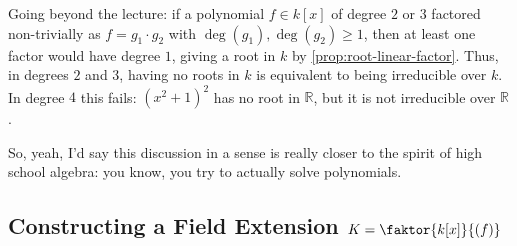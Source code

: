 \begin{content}

\begin{steps}
Going beyond the lecture: if a polynomial $f \in k[x]$ of degree $2$ or $3$ factored non-trivially as $f = g_1 \cdot g_2$ with $\deg(g_1), \deg(g_2) \ge 1$, then at least one factor would have degree $1$, giving a root in $k$ by \cref{prop:root-linear-factor}. Thus, in degrees $2$ and $3$, having no roots in $k$ is equivalent to being irreducible over $k$. In degree $4$ this fails: $(x^2 + 1)^2$ has no root in $\mathbb{R}$, but it is not irreducible over $\mathbb{R}$.
\end{steps}
\end{content}

\begin{speech}[00:59:04 - 01:00:02]
 So, yeah, I'd say this discussion in a sense is really closer to the spirit of high school algebra: you know, you try to actually solve polynomials.
\end{speech}

\subsection{Constructing a Field Extension \texorpdfstring{$K = \faktor{k[x]}{(f)}$}{K = k[x]/(f)}}

